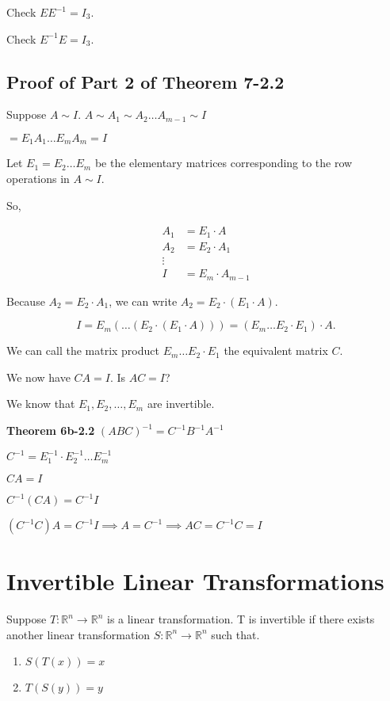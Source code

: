 \documentclass[12pt]{article}
\begin{document}
Check $E E^{-1} = I_3$.

Check $E^{-1} E = I_3$.


\subsection*{Proof of Part 2 of Theorem 7-2.2}

Suppose $A\sim I$. \qquad $A \sim A_1 \sim A_2 \dots A_{m-1} \sim I$

$= E_1 A_1 \dots E_m A_m = I$

Let $E_1 = E_2 \dots E_m$ be the elementary matrices corresponding to the row 
operations in $A \sim I$.

So,

\begin{align*}
  A_1 &= E_1 \cdot A \\
  A_2 &= E_2 \cdot A_1 \\
  \vdots \\
  I &= E_m \cdot A_{m-1}
\end{align*}

Because $A_2 = E_2 \cdot A_1$, we can write $A_2 = E_2 \cdot (E_1 \cdot A)$.

\[
  I = E_m(\dots(E_2 \cdot (E_1 \cdot A))) = (E_m \dots E_2 \cdot E_1) \cdot A
.\]

We can call the matrix product $E_m \dots E_2 \cdot E_1$ the equivalent matrix $C$.

We now have $CA=I$. Is $AC=I$?

We know that $E_1, E_2, \dots, E_m$ are invertible.

\indent\textbf{Theorem 6b-2.2} $(ABC)^{-1} = C^{-1}B^{-1}A^{-1}$

$C^{-1} = E_1^{-1} \cdot E_2^{-1} \dots E_m^{-1}$

$CA = I$

$C^{-1}(CA) = C^{-1}I$

$(C^{-1}C) A = C^{-1}I \implies A = C^{-1} \implies AC = C^{-1}C = I$

\section*{Invertible Linear Transformations}

Suppose $T: \mathbb{R}^n \to \mathbb{R}^n$ is a linear transformation.
T is invertible if there exists another linear transformation 
$S: \mathbb{R}^n \to \mathbb{R}^n$ such that.

\begin{enumerate}
  \item $S(T(x)) = x$
  \item $T(S(y)) = y$
\end{enumerate}
\end{document}
